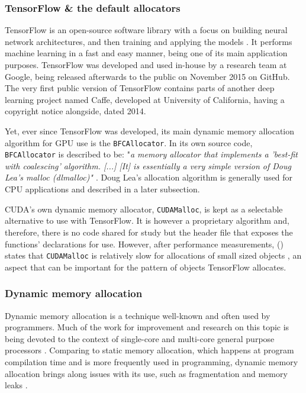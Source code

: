 \documentclass[12pt,twoside]{article}
\begin{document}
\subsubsection*{TensorFlow \& the default allocators}

TensorFlow is an open-source software library with a focus on building neural network architectures, and then training and applying the models \cite{TensorFlow-main-paper}. It performs machine learning in a fast and easy manner, being one of its main application purposes. TensorFlow was developed and used in-house by a research team at Google, being released afterwards to the public on November 2015 on GitHub. The very first public version of TensorFlow contains parts of another deep learning project named Caffe, developed at University of California, having a copyright notice alongside, dated 2014.

Yet, ever since TensorFlow was developed, its main dynamic memory allocation algorithm for GPU use is the \texttt{BFCAllocator}. In its own source code, \texttt{BFCAllocator} is described to be: "\textit{a memory allocator that implements a 'best-fit with coalescing' algorithm.  [...] [It] is essentially a very simple version of Doug Lea's malloc (dlmalloc)" \cite{Vinkler2015}}. Doug Lea's allocation algorithm is generally used for CPU applications and described in a later subsection. 

CUDA's own dynamic memory allocator, \texttt{CUDAMalloc}, is kept as a selectable alternative to use with TensorFlow. It is however a proprietary algorithm and, therefore, there is no code shared for study but the header file that exposes the functions' declarations for use. However, after performance measurements, \citeauthor{Vinkler2015} (\citeyear{Vinkler2015}) states that \texttt{CUDAMalloc} is relatively slow for allocations of small sized objects \cite{Vinkler2015}, an aspect that can be important for the pattern of objects TensorFlow allocates.

\subsubsection*{Dynamic memory allocation}

Dynamic memory allocation is a technique well-known and often used by programmers. Much of the work for improvement and research on this topic is being devoted to the context of single-core and multi-core general purpose processors \cite{YOU2015}. Comparing to static memory allocation, which happens at program compilation time and is more frequently used in programming, dynamic memory allocation brings along issues with its use, such as fragmentation and memory leaks \cite{TRAISTER199099}.
\end{document}
